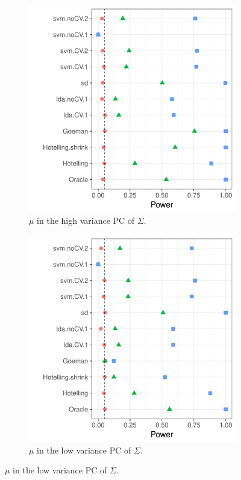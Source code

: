 \documentclass[12pt,a4paper]{article}
\begin{document}
\begin{figure}[h]
	\centering
	\caption{Heteroskedasticity: $\Sigma$ is diagonal with $\Sigma_{jj}=j$.}	
	\label{fig:heteroskedastic}	
	\begin{subfigure}[t]{.4\textwidth}
		\centering
		\includegraphics[width=1\linewidth]{"art/file26"}
		\caption{$\mu$ in the high variance PC of $\Sigma$.}  
		\label{fig:heteroskedastic_11}	
	\end{subfigure}
	\begin{subfigure}[t]{0.4\textwidth}
		\centering
		\includegraphics[width=1\linewidth]{"art/file24"}
		\caption{$\mu$ in the low variance PC of $\Sigma$.}  
		\label{fig:heteroskedastic_12}	
	\end{subfigure}
\end{figure}
\end{document}
